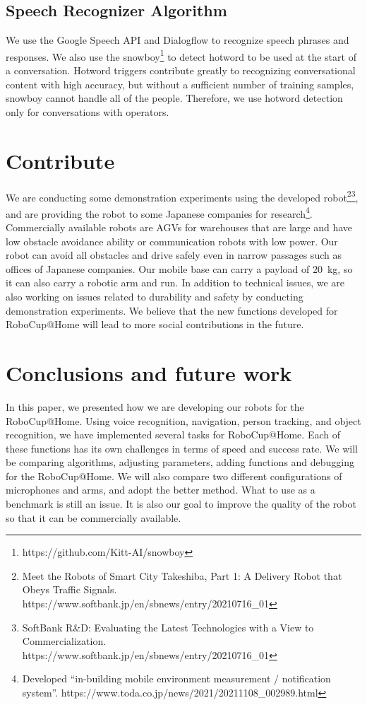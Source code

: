 \documentclass[runningheads,a4paper]{llncs}
\begin{document}
\subsection{Speech Recognizer Algorithm}
We use the Google Speech API and Dialogflow to recognize speech phrases and responses.
We also use the snowboy\footnote{https://github.com/Kitt-AI/snowboy} to detect hotword to be used at the start of a conversation.
Hotword triggers contribute greatly to recognizing conversational content with high accuracy, but without a sufficient number of training samples, snowboy cannot handle all of the people.
Therefore, we use hotword detection only for conversations with operators.

\section{Contribute}
We are conducting some demonstration experiments using the developed robot\footnote{Meet the Robots of Smart City Takeshiba, Part 1: A Delivery Robot that Obeys Traffic Signals. https://www.softbank.jp/en/sbnews/entry/20210716\_01}\footnote{SoftBank R\&D: Evaluating the Latest Technologies with a View to Commercialization. https://www.softbank.jp/en/sbnews/entry/20210716\_01}, and are providing the robot to some Japanese companies for research\footnote{Developed ``in-building mobile environment measurement / notification system''. https://www.toda.co.jp/news/2021/20211108\_002989.html}. Commercially available robots are AGVs for warehouses that are large and have low obstacle avoidance ability or communication robots with low power. Our robot can avoid all obstacles and drive safely even in narrow passages such as offices of Japanese companies. Our mobile base can carry a payload of 20~kg, so it can also carry a robotic arm and run. In addition to technical issues, we are also working on issues related to durability and safety by conducting demonstration experiments. We believe that the new functions developed for RoboCup@Home will lead to more social contributions in the future.

\section{Conclusions and future work}
In this paper, we presented how we are developing our robots for the RoboCup@Home. Using voice recognition, navigation, person tracking, and object recognition, we have implemented several tasks for RoboCup@Home. Each of these functions has its own challenges in terms of speed and success rate. We will be comparing algorithms, adjusting parameters, adding functions and debugging for the RoboCup@Home. We will also compare two different configurations of microphones and arms, and adopt the better method. What to use as a benchmark is still an issue. It is also our goal to improve the quality of the robot so that it can be commercially available.
\end{document}
